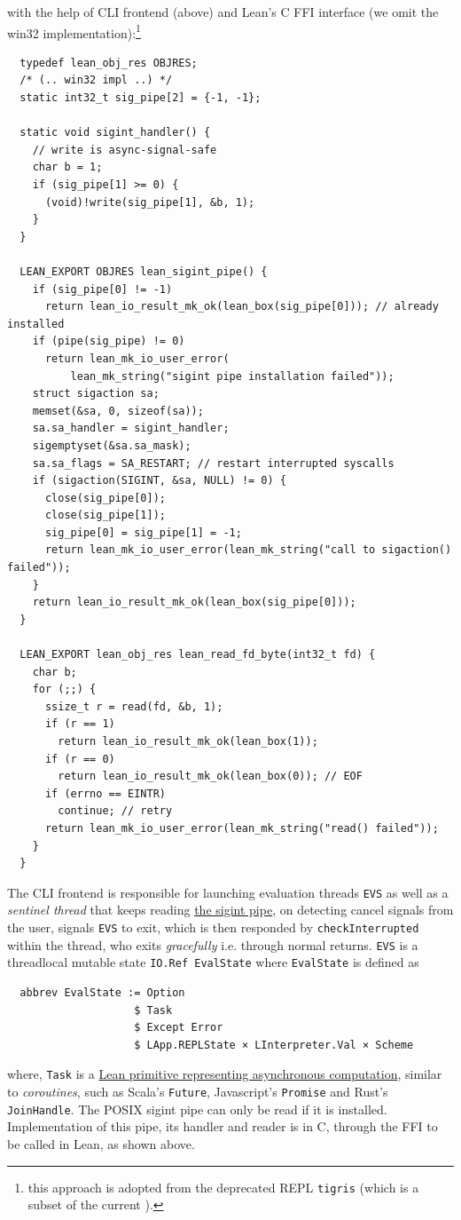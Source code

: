 \documentclass[a4paper, 11pt]{article}
\theoremstyle{remark}\newtheorem*{remark}{Remark}
\theoremstyle{definition}\newtheorem*{definition}{Definition}
\begin{document}
with the help of CLI frontend (above) and Lean's C FFI interface (we omit the win32 implementation):\footnote{
this approach is adopted from the deprecated REPL \texttt{tigris} (which is a subset of the current \Tigris).
}
\begin{verbatim}
  typedef lean_obj_res OBJRES;
  /* (.. win32 impl ..) */
  static int32_t sig_pipe[2] = {-1, -1};

  static void sigint_handler() {
    // write is async-signal-safe
    char b = 1;
    if (sig_pipe[1] >= 0) {
      (void)!write(sig_pipe[1], &b, 1);
    }
  }

  LEAN_EXPORT OBJRES lean_sigint_pipe() {
    if (sig_pipe[0] != -1)
      return lean_io_result_mk_ok(lean_box(sig_pipe[0])); // already installed
    if (pipe(sig_pipe) != 0)
      return lean_mk_io_user_error(
          lean_mk_string("sigint pipe installation failed"));
    struct sigaction sa;
    memset(&sa, 0, sizeof(sa));
    sa.sa_handler = sigint_handler;
    sigemptyset(&sa.sa_mask);
    sa.sa_flags = SA_RESTART; // restart interrupted syscalls
    if (sigaction(SIGINT, &sa, NULL) != 0) {
      close(sig_pipe[0]);
      close(sig_pipe[1]);
      sig_pipe[0] = sig_pipe[1] = -1;
      return lean_mk_io_user_error(lean_mk_string("call to sigaction() failed"));
    }
    return lean_io_result_mk_ok(lean_box(sig_pipe[0]));
  }

  LEAN_EXPORT lean_obj_res lean_read_fd_byte(int32_t fd) {
    char b;
    for (;;) {
      ssize_t r = read(fd, &b, 1);
      if (r == 1)
        return lean_io_result_mk_ok(lean_box(1));
      if (r == 0)
        return lean_io_result_mk_ok(lean_box(0)); // EOF
      if (errno == EINTR)
        continue; // retry
      return lean_mk_io_user_error(lean_mk_string("read() failed"));
    }
  }
\end{verbatim}

The CLI frontend is responsible for launching evaluation threads \texttt{EVS} as well as a \emph{sentinel thread} that
keeps reading \underline{the sigint pipe}, on detecting cancel signals from the user, signals \texttt{EVS} to exit,
which is then responded by \texttt{checkInterrupted} within the thread, who exits \emph{gracefully} i.e. through normal returns. \texttt{EVS} is a threadlocal mutable state \texttt{IO.Ref EvalState} where \texttt{EvalState} is defined as
\begin{verbatim}
  abbrev EvalState := Option
                    $ Task
                    $ Except Error
                    $ LApp.REPLState × LInterpreter.Val × Scheme
\end{verbatim}
where, \texttt{Task} is a \underline{Lean primitive representing asynchronous computation}, similar to \emph{coroutines}, such as Scala's \texttt{Future}, Javascript's \texttt{Promise} and Rust's \texttt{JoinHandle}. The POSIX sigint pipe can only be read if it is installed. Implementation of this pipe, its handler and reader
is in C, through the FFI to be called in Lean, as shown above.
\end{document}
